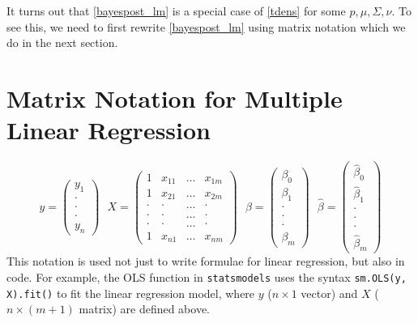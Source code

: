 \documentclass{scrartcl}
\begin{document}
It turns out that \eqref{bayespost_lm} is a special case of
\eqref{tdens} for some $p, \mu, \Sigma, \nu$. To see this, we need to
first rewrite \eqref{bayespost_lm} using matrix notation which we do
in the next section.


\section{Matrix Notation for Multiple Linear Regression}
\begin{equation*}
  y =
  \begin{pmatrix}
    y_1 \\ \cdot \\ \cdot \\ \cdot \\ y_n
  \end{pmatrix} ~~~ X =
  \begin{pmatrix}
    1 & x_{11} & \dots & x_{1m} \\
    1 & x_{21} & \dots & x_{2m} \\
    \cdot & \cdot & \dots & \cdot \\
    \cdot & \cdot & \dots & \cdot \\
    \cdot & \cdot & \dots & \cdot \\
    1 & x_{n1} & \dots & x_{nm}
  \end{pmatrix} ~~~
  \beta =
  \begin{pmatrix}
    \beta_0 \\ \beta_1 \\ \cdot \\ \cdot \\ \cdot \\ \beta_m
  \end{pmatrix} ~~~
  \hat{\beta} =
  \begin{pmatrix}
    \hat{\beta}_0 \\ \hat{\beta}_1 \\ \cdot \\ \cdot \\ \cdot \\ \hat{\beta}_m
  \end{pmatrix}
\end{equation*}
This notation is used not just to write formulae for linear
regression, but also in code. For example, the OLS function in
\texttt{statsmodels} uses the syntax \texttt{sm.OLS(y, X).fit()} to
fit the linear regression model, where $y$ ($n \times 1$ vector) and
$X$ ($n \times (m+1)$ matrix) are defined above. 
\end{document}
